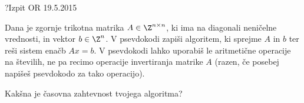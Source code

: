 \begin{naloga}{?}{Izpit OR 19.5.2015}
\begin{vprasanje}
Dana je zgornje trikotna matrika $A \in \Z^{n \times n}$,
ki ima na diagonali neničelne vred\-no\-sti,
in vektor $b \in \Z^n$.
V psevdokodi zapiši algoritem, ki sprejme $A$ in $b$
ter reši sistem enačb $Ax = b$.
V psevdokodi lahko uporabiš le aritmetične operacije na številih,
ne pa recimo operacije invertiranja matrike $A$
(razen, če posebej napišeš psevdokodo za tako operacijo).

Kakšna je časovna zahtevnost tvojega algoritma?
\end{vprasanje}
\begin{odgovor}
\end{odgovor}
\end{naloga}
